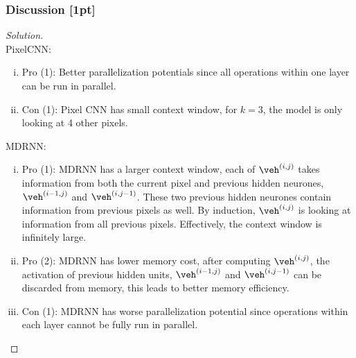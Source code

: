 \documentclass{article}
\begin{document}
	\subsubsection{Discussion [1pt]}
	\begin{proof}[Solution] \quad \\
		PixelCNN:
		\begin{enumerate}[(i)]
			\item Pro (1): Better parallelization potentials since all operations within one layer can be run in parallel.
			\item Con (1): Pixel CNN has small context window, for $k=3$, the model is only looking at 4 other pixels.
		\end{enumerate}
		MDRNN:
		\begin{enumerate}[(i)]
			\item Pro (1): MDRNN has a larger context window, each of $\veh^{(i, j)}$ takes information from both the current pixel and previous hidden neurones, $\veh^{(i-1, j)}$ and $\veh^{(i, j-1)}$. These two previous hidden neurones contain information from previous pixels as well. By induction, $\veh^{(i, j)}$ is looking at information from all previous pixels. Effectively, the context window is infinitely large.
			\item Pro (2): MDRNN has lower memory cost, after computing $\veh^{(i, j)}$, the activation of previous hidden units, $\veh^{(i-1, j)}$ and $\veh^{(i, j-1)}$ can be discarded from memory, this leads to better memory efficiency.
			\item Con (1): MDRNN has worse parallelization potential since operations within each layer cannot be fully run in parallel.
		\end{enumerate}
	\end{proof}
\end{document}
